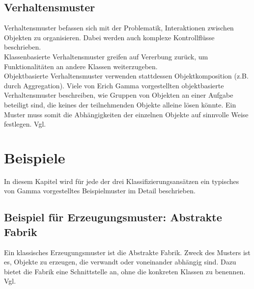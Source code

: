 \documentclass[fontsize=11pt,a4paper,final]{scrreprt}[2003/01/01]
\begin{document}
\subsection{Verhaltensmuster}\label{se:Verhaltensmuster}

Verhaltensmuster befassen sich mit der Problematik, Interaktionen zwischen Objekten zu organisieren. Dabei werden auch komplexe Kontrollflüsse beschrieben. \\
Klassenbasierte Verhaltensmuster greifen auf Vererbung zurück, um Funktionalitäten an andere Klassen weiterzugeben. \\
Objektbasierte Verhaltensmuster verwenden stattdessen Objektkomposition (z.B. durch Aggregation). Viele von Erich Gamma vorgestellten objektbasierte Verhaltensmuster beschreiben, wie Gruppen von Objekten an einer Aufgabe beteiligt sind, die keines der teilnehmenden Objekte alleine lösen könnte. Ein Muster muss somit die Abhängigkeiten der einzelnen Objekte auf sinnvolle Weise festlegen. Vgl. \cite[S. 271]{gamma2004}

\section{Beispiele}
In diesem Kapitel wird für jede der drei Klassifizierungsansätzen ein typisches von Gamma vorgestelltes Beispielmuster im Detail beschrieben.

\subsection{Beispiel für Erzeugungsmuster: Abstrakte Fabrik}

Ein klassisches Erzeugungsmuster ist die Abstrakte Fabrik. Zweck des Musters ist es, Objekte zu erzeugen, die verwandt oder voneinander abhängig sind. Dazu bietet die Fabrik eine Schnittstelle an, ohne die konkreten Klassen zu benennen. Vgl. \cite[S. 107]{gamma2004}
\end{document}
